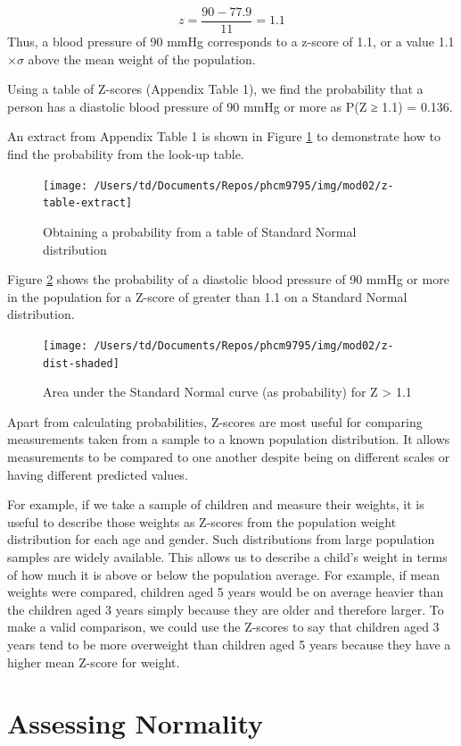 \documentclass[
]{memoir}
\begin{document}
\[ z = \frac{90 - 77.9}{11} = 1.1 \]
Thus, a blood pressure of 90 mmHg corresponds to a z-score of 1.1, or a value 1.1 \(\times \sigma\) above the mean weight of the population.

Using a table of Z-scores (Appendix Table 1), we find the probability that a person has a diastolic blood pressure of 90 mmHg or more as P(Z ≥ 1.1) = 0.136.

An extract from Appendix Table 1 is shown in Figure \ref{fig:fig-2-4} to demonstrate how to find the probability from the look-up table.

\begin{figure}
\texttt{[image: /Users/td/Documents/Repos/phcm9795/img/mod02/z-table-extract]} \caption{Obtaining a probability from a table of Standard Normal distribution}\label{fig:fig-2-4}
\end{figure}

Figure \ref{fig:fig-2-5} shows the probability of a diastolic blood pressure of 90 mmHg or more in the population for a Z-score of greater than 1.1 on a Standard Normal distribution.

\begin{figure}
\texttt{[image: /Users/td/Documents/Repos/phcm9795/img/mod02/z-dist-shaded]} \caption{Area under the Standard Normal curve (as probability) for Z > 1.1}\label{fig:fig-2-5}
\end{figure}

Apart from calculating probabilities, Z-scores are most useful for comparing measurements taken from a sample to a known population distribution. It allows measurements to be compared to one another despite being on different scales or having different predicted values.

For example, if we take a sample of children and measure their weights, it is useful to describe those weights as Z-scores from the population weight distribution for each age and gender. Such distributions from large population samples are widely available. This allows us to describe a child's weight in terms of how much it is above or below the population average. For example, if mean weights were compared, children aged 5 years would be on average heavier than the children aged 3 years simply because they are older and therefore larger. To make a valid comparison, we could use the Z-scores to say that children aged 3 years tend to be more overweight than children aged 5 years because they have a higher mean Z-score for weight.

\hypertarget{assessing-normality}{%
\section{Assessing Normality}\label{assessing-normality}}
\end{document}
